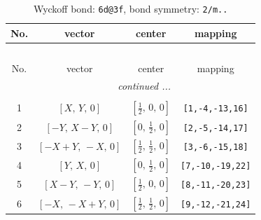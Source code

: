 \documentclass[fleqn,8pt]{jsarticle}
\begin{document}
\renewcommand{\arraystretch}{1.2}
\begin{longtable}{cccc}
\caption{Wyckoff bond: {\tt 6d@3f}, bond symmetry: {\tt 2/m..}}
 \\
 \hline \hline
No. & vector & center & mapping \\ \hline \endfirsthead

\multicolumn{3}{l}{\tablename\ \thetable{}} \\
 \hline \hline
No. & vector & center & mapping \\ \hline \endhead

 \hline \hline
\multicolumn{3}{r}{\footnotesize\it continued ...} \\ \endfoot

 \hline \hline
\multicolumn{3}{r}{} \\ \endlastfoot

1 & $\left[ X,\, Y,\, 0 \right]$ & $\left[ \frac{1}{2},\, 0,\, 0 \right]$ & {\tt [1,-4,-13,16]} \\ \hline
2 & $\left[ - Y,\, X - Y,\, 0 \right]$ & $\left[ 0,\, \frac{1}{2},\, 0 \right]$ & {\tt [2,-5,-14,17]} \\ \hline
3 & $\left[ - X + Y,\, - X,\, 0 \right]$ & $\left[ \frac{1}{2},\, \frac{1}{2},\, 0 \right]$ & {\tt [3,-6,-15,18]} \\ \hline
4 & $\left[ Y,\, X,\, 0 \right]$ & $\left[ 0,\, \frac{1}{2},\, 0 \right]$ & {\tt [7,-10,-19,22]} \\ \hline
5 & $\left[ X - Y,\, - Y,\, 0 \right]$ & $\left[ \frac{1}{2},\, 0,\, 0 \right]$ & {\tt [8,-11,-20,23]} \\ \hline
6 & $\left[ - X,\, - X + Y,\, 0 \right]$ & $\left[ \frac{1}{2},\, \frac{1}{2},\, 0 \right]$ & {\tt [9,-12,-21,24]} \\
\end{longtable}
\renewcommand{\arraystretch}{1.2}
\end{document}
